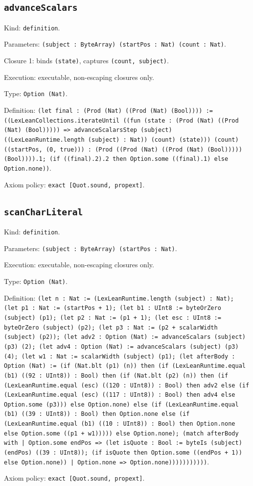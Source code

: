 \documentclass[11pt]{article}
\begin{document}
\subsection*{\texttt{advanceScalars}}
\noindent Kind: \texttt{definition}.\par
\noindent Parameters: \texttt{(subject : ByteArray) (startPos : Nat) (count : Nat)}.\par
\noindent Closure 1: binds \texttt{(state)}, captures \texttt{(count, subject)}.\par
\noindent Execution: executable, non-escaping closures only.\par
\noindent Type: \texttt{Option (Nat)}.\par
\noindent Definition: \texttt{(let final : (Prod (Nat) ((Prod (Nat) (Bool)))) := ((LexLeanCollections.iterateUntil ((fun (state : (Prod (Nat) ((Prod (Nat) (Bool))))) => advanceScalarsStep (subject) ((LexLeanRuntime.length (subject) : Nat)) (count) (state))) (count) ((startPos, (0, true))) : (Prod ((Prod (Nat) ((Prod (Nat) (Bool))))) (Bool)))).1; (if ((final).2).2 then Option.some ((final).1) else Option.none))}.\par
\noindent Axiom policy: \texttt{exact [Quot.sound, propext]}.\par
\subsection*{\texttt{scanCharLiteral}}
\noindent Kind: \texttt{definition}.\par
\noindent Parameters: \texttt{(subject : ByteArray) (startPos : Nat)}.\par
\noindent Execution: executable, non-escaping closures only.\par
\noindent Type: \texttt{Option (Nat)}.\par
\noindent Definition: \texttt{(let n : Nat := (LexLeanRuntime.length (subject) : Nat); (let p1 : Nat := (startPos + 1); (let b1 : UInt8 := byteOrZero (subject) (p1); (let p2 : Nat := (p1 + 1); (let esc : UInt8 := byteOrZero (subject) (p2); (let p3 : Nat := (p2 + scalarWidth (subject) (p2)); (let adv2 : Option (Nat) := advanceScalars (subject) (p3) (2); (let adv4 : Option (Nat) := advanceScalars (subject) (p3) (4); (let w1 : Nat := scalarWidth (subject) (p1); (let afterBody : Option (Nat) := (if (Nat.blt (p1) (n)) then (if (LexLeanRuntime.equal (b1) ((92 : UInt8)) : Bool) then (if (Nat.blt (p2) (n)) then (if (LexLeanRuntime.equal (esc) ((120 : UInt8)) : Bool) then adv2 else (if (LexLeanRuntime.equal (esc) ((117 : UInt8)) : Bool) then adv4 else Option.some (p3))) else Option.none) else (if (LexLeanRuntime.equal (b1) ((39 : UInt8)) : Bool) then Option.none else (if (LexLeanRuntime.equal (b1) ((10 : UInt8)) : Bool) then Option.none else Option.some ((p1 + w1))))) else Option.none); (match afterBody with | Option.some endPos => (let isQuote : Bool := byteIs (subject) (endPos) ((39 : UInt8)); (if isQuote then Option.some ((endPos + 1)) else Option.none)) | Option.none => Option.none)))))))))))}.\par
\noindent Axiom policy: \texttt{exact [Quot.sound, propext]}.\par
\end{document}
